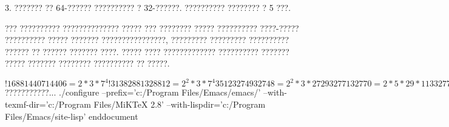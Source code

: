 \documentclass[11pt]{article} %
\begin{document}
3. ??????? ?? 64-?????? ?????????? ? 32-??????. ?????????? ???????? ? 5 ???.

??? ?????????? ?????????????? ????? ??? ???????? ????? ?????????? ????-????? ?????????? ????? ??????? ????????????????,
????????? ????????? ?????????? ?????? ?? ?????? ??????? ????.
????? ???? ????????????? ?????????? ??????? ????? ??????? ???????? ?????????? ?? ?????.




$
!1688 14407 14406 = 2 * 3 * 7^4
!3138 28813 28812 = 2^2 * 3 * 7^4
3512 32749 32748 = 2^2 * 3 * 2729
32771 32770 = 2 * 5 * 29 * 113
32779 32778 = 2 * 3^3 * 607
32783 32782 = 2 * 37 * 443
3516 32789 32788 = 2^2 * 7 * 1171
3517 32797 32798 = 2 * 23^2 * 31
!3518 32801 32800 = 2^5 * 5^2 * 41
3519 32803 32802 = 2 * 3 * 7 * 11 * 71
3520 32831 32830 = 2 * 5 * 7^2 * 67
32833 32832 = 2^6 * 3^3 * 19
32839 32838 = 2 * 3 * 13 * 421
32843 32842 = 2 * 16421
3524 32869 32868 = 2^2 * 3^2 * 11 * 83
3525 32887 32888 = 2^3 * 4111
3526 32909 32908 = 2^2 * 19 * 433
3527 32911 32910 = 2 * 3 * 5 * 1097
3528 32917 32916 = 2^2 * 3 * 13 * 211
!3749 35153 35152 = 2^4 * 13^3
!4144 39367 39366 = 2 * 3^9
!5675 55903 55902 = 2 * 3 * 7 * 11^3
!5905 58321 58320 = 2^4 * 3^6 * 5
6000 59359 59358 = 2 * 3 * 13 * 761
6100 60497 60498 = 2 * 3^2 * 3361
6200 61631 61630 = 2 * 5 * 6163
6276 62501 62500 = 2^2 * 5^6
6300 62773 62772 = 2^2 * 3 * 5231
6400 63809 63808 = 2^6 * 997
6500 65063 65062 = 2 * 32531
6501 65071 65070 = 2 * 3^3 * 5 * 241
6510 65147
6520 65267
6530 65381
6531 65393 65392 = 2^4 * 61 * 67
6532 65407 65406 = 2 * 3 * 11 * 991
6533 65413 65412 = 2^2 * 3^2 * 23 * 79 65413 divides 34^23-1
6534 65419 65418 = 2 * 3 * 10903
6535 65423 65422 = 2 * 7 * 4673
6536 65437 65436 = 2^2 * 3 * 7 * 19 * 41
6537 65447 65446 = 2 * 43 * 761
6538 65449 65448 = 2^3 * 3^4 * 101 65449 = 80^2 243^2 65449^2 = 38880^2 52649^2 65449 = 2^16-87
6539 65479 65478 = 2 * 3 * 7 * 1559
6540 65497 65498 = 2 * 32749
6541 65519 2 * 17 * 41 * 47
6542 65521 65520 = 2^4 * 3^2 * 5 * 7 * 13
6543 65537 65536 = 2^16
6545 65543
6549 65579 $
???????????...
./configure --prefix='c:/Program Files/Emacs/emacs/'
--with-texmf-dir='c:/Program Files/MiKTeX 2.8'
--with-lispdir='c:/Program Files/Emacs/site-lisp'
end{document} 
\end{document}
